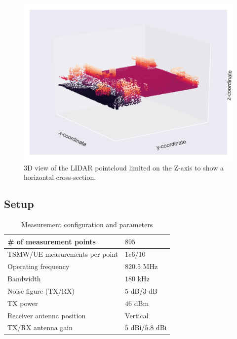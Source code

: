 \begin{figure}
    \centering
    \includegraphics[width=\textwidth]{chapters/part_pathloss/figures/outdoor_to_indoor/3d_view.png}
    \caption{$3$D view of the LIDAR pointcloud limited on the Z-axis to show a horizontal cross-section.}
    \label{fig:tunnel_3d_view}
\end{figure}


\subsection{Setup}

\begin{table}[htbp]
\centering
\begin{tabular}{@{}l|l@{}}
\toprule
\# of measurement points       & $895$             \\ \midrule
TSMW/UE measurements per point & $1e6/10$          \\ \midrule
Operating frequency            & $820.5$ MHz       \\ \midrule
Bandwidth                      & $180$ kHz         \\ \midrule
Noise figure (TX/RX)           & $5$ dB/$3$ dB     \\ \midrule
TX power                       & $46$ dBm          \\ \midrule
Receiver antenna position      & Vertical          \\ \midrule
TX/RX antenna gain             & $5$ dBi/$5.8$ dBi \\ \bottomrule
\end{tabular}
\caption{Measurement configuration and parameters}\label{tab:measurement_configuration}
\end{table}

